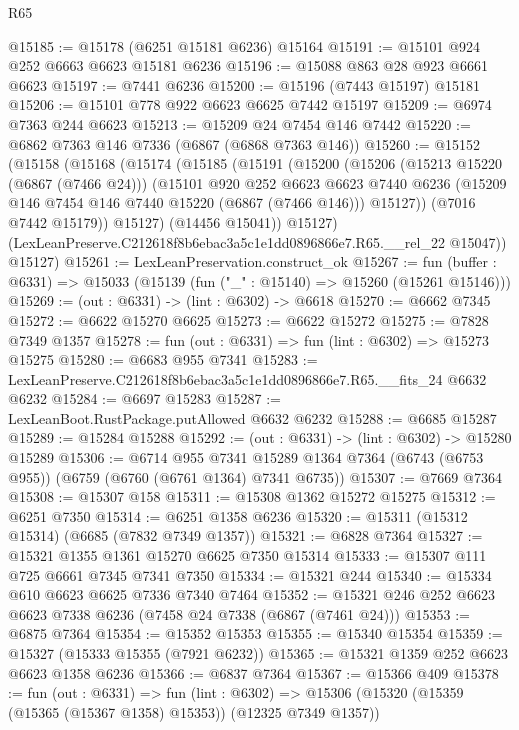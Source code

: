 \begin{lexlean}{R65}
\begin{coremodule}
{@15185 := @15178 (@6251 @15181 @6236) @15164
@15191 := @15101 @924 @252 @6663 @6623 @15181 @6236
@15196 := @15088 @863 @28 @923 @6661 @6623
@15197 := @7441 @6236
@15200 := @15196 (@7443 @15197) @15181
@15206 := @15101 @778 @922 @6623 @6625 @7442 @15197
@15209 := @6974 @7363 @244 @6623
@15213 := @15209 @24 @7454 @146 @7442
@15220 := @6862 @7363 @146 @7336 (@6867 (@6868 @7363 @146))
@15260 := @15152
    (@15158
      (@15168
        (@15174
          (@15185
            (@15191
              (@15200
                (@15206
                  (@15213 @15220 (@6867 (@7466 @24)))
                  (@15101
                    @920
                    @252
                    @6623
                    @6623
                    @7440
                    @6236
                    (@15209 @146 @7454 @146 @7440 @15220 (@6867 (@7466 @146)))
                    @15127))
                (@7016 @7442 @15179))
              @15127)
            (@14456 @15041))
          @15127)
        (LexLeanPreserve.C212618f8b6ebac3a5c1e1dd0896866e7.R65.__rel_22 @15047))
      @15127)
@15261 := LexLeanPreservation.construct_ok
@15267 := fun (buffer : @6331) => @15033 (@15139 (fun ("_" : @15140) => @15260 (@15261 @15146)))
@15269 := (out : @6331) -> (lint : @6302) -> @6618
@15270 := @6662 @7345
@15272 := @6622 @15270 @6625
@15273 := @6622 @15272
@15275 := @7828 @7349 @1357
@15278 := fun (out : @6331) => fun (lint : @6302) => @15273 @15275
@15280 := @6683 @955 @7341
@15283 := LexLeanPreserve.C212618f8b6ebac3a5c1e1dd0896866e7.R65.__fits_24 @6632 @6232
@15284 := @6697 @15283
@15287 := LexLeanBoot.RustPackage.putAllowed @6632 @6232
@15288 := @6685 @15287
@15289 := @15284 @15288
@15292 := (out : @6331) -> (lint : @6302) -> @15280 @15289
@15306 := @6714
    @955
    @7341
    @15289
    @1364
    @7364
    (@6743 (@6753 @955))
    (@6759 (@6760 (@6761 @1364) @7341 @6735))
@15307 := @7669 @7364
@15308 := @15307 @158
@15311 := @15308 @1362 @15272 @15275
@15312 := @6251 @7350
@15314 := @6251 @1358 @6236
@15320 := @15311 (@15312 @15314) (@6685 (@7832 @7349 @1357))
@15321 := @6828 @7364
@15327 := @15321 @1355 @1361 @15270 @6625 @7350 @15314
@15333 := @15307 @111 @725 @6661 @7345 @7341 @7350
@15334 := @15321 @244
@15340 := @15334 @610 @6623 @6625 @7336 @7340 @7464
@15352 := @15321 @246 @252 @6623 @6623 @7338 @6236 (@7458 @24 @7338 (@6867 (@7461 @24)))
@15353 := @6875 @7364
@15354 := @15352 @15353
@15355 := @15340 @15354
@15359 := @15327 (@15333 @15355 (@7921 @6232))
@15365 := @15321 @1359 @252 @6623 @6623 @1358 @6236
@15366 := @6837 @7364
@15367 := @15366 @409
@15378 := fun (out : @6331) =>
  fun (lint : @6302) => @15306 (@15320 (@15359 (@15365 (@15367 @1358) @15353)) (@12325 @7349 @1357))
}
\end{coremodule}
\end{lexlean}
